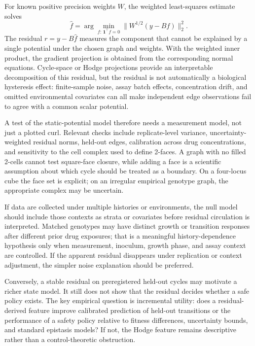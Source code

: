 \documentclass[11pt]{article}
\theoremstyle{definition}\newtheorem{definition}[proposition]{Definition}\theoremstyle{remark}\newtheorem{remark}[proposition]{Remark}
\begin{document}
For known positive precision weights $W$, the weighted least-squares estimate solves
\begin{equation}\label{eq:wls}
\widehat f=\arg\min_{f:\,\mathbf{1}^{\top}f=0}\lVert W^{1/2}(y-Bf)\rVert_2^2.
\end{equation}
The residual $r=y-B\widehat f$ measures the component that cannot be explained by a single potential under the chosen graph and weights. With the weighted inner product, the gradient projection is obtained from the corresponding normal equations. Cycle-space or Hodge projections provide an interpretable decomposition of this residual, but the residual is not automatically a biological hysteresis effect: finite-sample noise, assay batch effects, concentration drift, and omitted environmental covariates can all make independent edge observations fail to agree with a common scalar potential.

A test of the static-potential model therefore needs a measurement model, not just a plotted curl. Relevant checks include replicate-level variance, uncertainty-weighted residual norms, held-out edges, calibration across drug concentrations, and sensitivity to the cell complex used to define 2-faces. A graph with no filled 2-cells cannot test square-face closure, while adding a face is a scientific assumption about which cycle should be treated as a boundary. On a four-locus cube the face set is explicit; on an irregular empirical genotype graph, the appropriate complex may be uncertain.

If data are collected under multiple histories or environments, the null model should include those contexts as strata or covariates before residual circulation is interpreted. Matched genotypes may have distinct growth or transition responses after different prior drug exposures; that is a meaningful history-dependence hypothesis only when measurement, inoculum, growth phase, and assay context are controlled. If the apparent residual disappears under replication or context adjustment, the simpler noise explanation should be preferred.

Conversely, a stable residual on preregistered held-out cycles may motivate a richer state model. It still does not show that the residual decides whether a safe policy exists. The key empirical question is incremental utility: does a residual-derived feature improve calibrated prediction of held-out transitions or the performance of a safety policy relative to fitness differences, uncertainty bounds, and standard epistasis models? If not, the Hodge feature remains descriptive rather than a control-theoretic obstruction.
\end{document}
